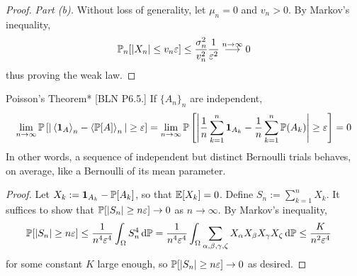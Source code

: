 \begin{proof}
    \emph{Part (b).} Without loss of generality, let \(\mu_n = 0\) and \(v_n > 0\). By Markov's inequality, 
    \[
        \mathbb{P}_n[|X_n| \leq v_n \varepsilon]
        \leq \frac{\sigma_n^2}{v_n^2} \frac{1}{\varepsilon^2} \stackrel{n \to \infty}{\longrightarrow} 0
    \]
    thus proving the weak law. 
\end{proof}


\begin{problem}{Poisson's Theorem}*
    [BLN P6.5.] If \(\{A_n\}_n\) are independent,
    \[
        \lim_{n \to \infty} \bb{P}\left[ |\ev{\mb{1}_A}_n - \ev{\bb{P}[A]}_n | \geq \varepsilon \right]
        = \lim_{n \to \infty} \bb{P}\left[ \left| \frac{1}{n} \sum_{k=1}^n \mb{1}_{A_k} - \frac{1}{n} \sum_{k=1}^n \bb{P}(A_k) \right| \geq \varepsilon \right] 
        = 0
    \]
    In other words, a sequence of independent but distinct Bernoulli trials behaves, on average, like a Bernoulli of its mean parameter.
\end{problem}

\begin{proof}
    Let \(X_k := \mathbf{1}_{A_k} - \mathbb{P}[A_k]\), so that \(\mathbb{E}[X_k] = 0\). Define \(S_n := \sum_{k=1}^n X_k\). It suffices to show that \(\mathbb{P}[|S_n| \geq n \varepsilon] \to 0\) as \(n \to \infty\). By Markov's inequality, 
    \begin{align*}
        \mathbb{P}[|S_n| \geq n \varepsilon] 
        &\leq \frac{1}{n^4 \varepsilon^4} \int_{\Omega} S_n^4 \, \mathrm{d}\mathbb{P}
        = \frac{1}{n^4 \varepsilon^4} \int_\Omega \sum_{\alpha,\beta,\gamma,\zeta} X_\alpha X_\beta X_\gamma X_\zeta \, \mathrm{d}\mathbb{P}
        \leq \frac{K}{n^2 \varepsilon^4} 
    \end{align*}
    for some constant \(K\) large enough, so \(\mathbb{P}[|S_n| \geq n \varepsilon] \to 0\) as desired. 
\end{proof}



